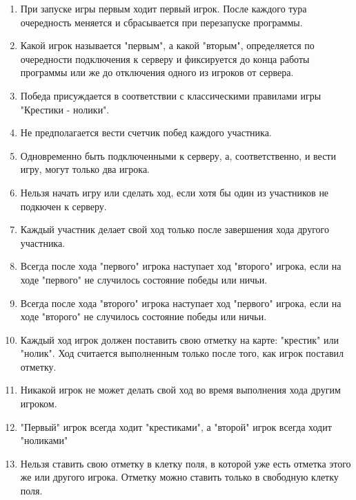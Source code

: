 
\begin{enumerate}

	\item При запуске игры первым ходит первый игрок. После каждого тура очередность меняется и сбрасывается при перезапуске программы. 

	\item Какой игрок называется "первым", а какой "вторым", определяется по очередности подключения к серверу и фиксируется до конца работы программы или же до отключения одного из игроков от сервера.

	\item Победа присуждается в соответствии с классическими правилами игры "Крестики - нолики".
	
	\item Не предполагается вести счетчик побед каждого участника.
	
	\item Одновременно быть подключенными к серверу, а, соответственно, и вести игру, могут только два игрока.
	
	\item Нельзя начать игру или сделать ход, если хотя бы один из участников не подкючен к серверу.
	
	\item Каждый участник делает свой ход только после завершения хода другого участника.
	
	\item Всегда после хода "первого" игрока наступает ход "второго" игрока, если на ходе "первого" не случилось состояние победы или ничьи.
	
	\item Всегда после хода "второго" игрока наступает ход "первого" игрока, если на ходе "второго" не случилось состояние победы или ничьи.
	
	\item Каждый ход игрок должен поставить свою отметку на карте: "крестик" или "нолик". Ход считается выполненным только после того, как игрок поставил отметку.
	
	\item Никакой игрок не может делать свой ход во время выполнения хода другим игроком.
	
	\item "Первый" игрок всегда ходит "крестиками", а "второй" игрок всегда ходит "ноликами"
	
	\item Нельзя ставить свою отметку в клетку поля, в которой уже есть отметка этого же или другого игрока. Отметку можно ставить только в свободную клетку поля.
	

\end{enumerate}
